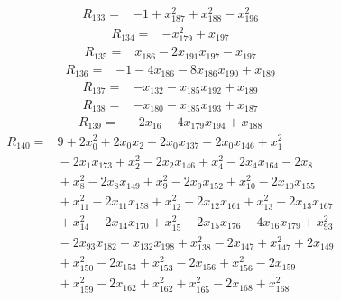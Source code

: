 {\begin{align*}
\end{align*}
\begin{align*}
R_{133} ={}& -1 + x_{187}^{2} + x_{188}^{2} - x_{196}^{2}
\end{align*}
\begin{align*}
R_{134} ={}& -x_{179}^{2} + x_{197}
\end{align*}
\begin{align*}
R_{135} ={}& x_{186} - 2x_{191} x_{197} - x_{197}
\end{align*}
\begin{align*}
R_{136} ={}& -1 - 4x_{186} - 8x_{186} x_{190} + x_{189}
\end{align*}
\begin{align*}
R_{137} ={}& -x_{132} - x_{185} x_{192} + x_{189}
\end{align*}
\begin{align*}
R_{138} ={}& -x_{180} - x_{185} x_{193} + x_{187}
\end{align*}
\begin{align*}
R_{139} ={}& -2x_{16} - 4x_{179} x_{194} + x_{188}
\end{align*}
\begin{align*}
R_{140} ={}& 9 + 2x_{0}^{2} + 2x_{0} x_{2} - 2x_{0} x_{137} - 2x_{0} x_{146} + x_{1}^{2} \\
&{}  - 2x_{1} x_{173} + x_{2}^{2} - 2x_{2} x_{146} + x_{4}^{2} - 2x_{4} x_{164} - 2x_{8} \\
&{}  + x_{8}^{2} - 2x_{8} x_{149} + x_{9}^{2} - 2x_{9} x_{152} + x_{10}^{2} - 2x_{10} x_{155} \\
&{}  + x_{11}^{2} - 2x_{11} x_{158} + x_{12}^{2} - 2x_{12} x_{161} + x_{13}^{2} - 2x_{13} x_{167} \\
&{}  + x_{14}^{2} - 2x_{14} x_{170} + x_{15}^{2} - 2x_{15} x_{176} - 4x_{16} x_{179} + x_{93}^{2} \\
&{}  - 2x_{93} x_{182} - x_{132} x_{198} + x_{138}^{2} - 2x_{147} + x_{147}^{2} + 2x_{149} \\
&{}  + x_{150}^{2} - 2x_{153} + x_{153}^{2} - 2x_{156} + x_{156}^{2} - 2x_{159} \\
&{}  + x_{159}^{2} - 2x_{162} + x_{162}^{2} + x_{165}^{2} - 2x_{168} + x_{168}^{2} \\

\end{align*}}

